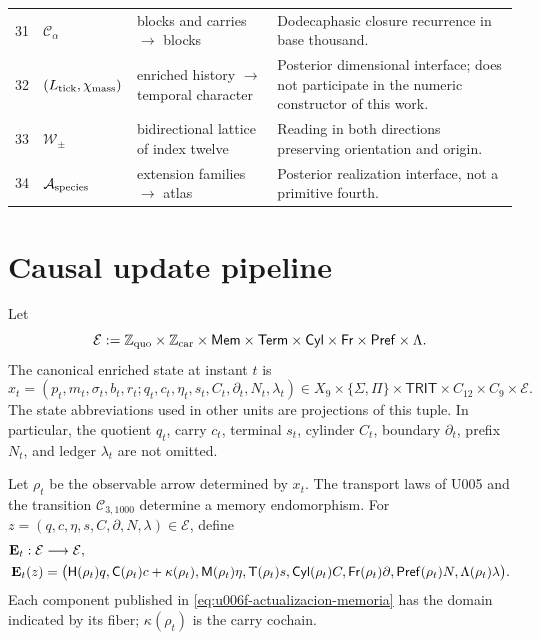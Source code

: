 \begin{longtable}{@{}r p{}p{}p{}@{}}
31&\(\mathcal C_\alpha\)&blocks and carries \(\to\) blocks&
Dodecaphasic closure recurrence in base thousand.\\
32&\((L_{\rm tick},\chi_{\rm mass})\)&enriched history \(\to\)
temporal character&
Posterior dimensional interface; does not participate in the numeric constructor of
this work.\\
33&\(\mathcal W_\pm\)&bidirectional lattice of index twelve&
Reading in both directions preserving orientation and origin.\\
34&\(\mathcal A_{\rm species}\)&extension families \(\to\) atlas&
Posterior realization interface, not a primitive fourth.\\
\bottomrule
\end{longtable}
\endgroup

\section{Causal update pipeline}

\begin{definition}
\label{def:u006f-esquema-estado}
Let
\[
 \mathcal E:=
 \mathbb Z_{\rm quo}\times\mathbb Z_{\rm car}\times
 \mathsf{Mem}\times\mathsf{Term}\times\mathsf{Cyl}\times
 \mathsf{Fr}\times\mathsf{Pref}\times\Lambda .
\]
The canonical enriched state at instant \(t\) is
\begin{equation}
 x_t=(p_t,m_t,\sigma_t,b_t,r_t;
 q_t,c_t,\eta_t,s_t,C_t,\partial_t,N_t,\lambda_t)
 \in
 X_9\times\{\Sigma,\Pi\}\times\mathsf{TRIT}\times
 C_{12}\times C_9\times\mathcal E.
 \label{eq:u006f-esquema-estado}
\end{equation}
The state abbreviations used in other units are projections of
this tuple. In particular, the quotient \(q_t\), carry
\(c_t\), terminal \(s_t\), cylinder \(C_t\), boundary
\(\partial_t\), prefix \(N_t\), and ledger \(\lambda_t\) are not omitted.
\end{definition}

Let \(\rho_t\) be the observable arrow determined by \(x_t\). The transport laws of U005 and the transition \(\mathcal C_{3,1000}\) determine a memory endomorphism. For \(z=(q,c,\eta,s,C,\partial,N,\lambda)\in\mathcal E\), define
\begin{align}
 \mathbf E_t:\mathcal E&\longrightarrow\mathcal E,\notag\\
 \mathbf E_t(z)&=\bigl(
 \mathsf H(\rho_t)q,
 \mathsf C(\rho_t)c+\kappa(\rho_t),
 \mathsf M(\rho_t)\eta,
 \mathsf T(\rho_t)s,
 \mathsf{Cyl}(\rho_t)C,
 \mathsf{Fr}(\rho_t)\partial,
 \mathsf{Pref}(\rho_t)N,
 \Lambda(\rho_t)\lambda
 \bigr).
 \label{eq:u006f-actualizacion-memoria}
\end{align}
Each component published in \eqref{eq:u006f-actualizacion-memoria} has the
domain indicated by its fiber; \(\kappa(\rho_t)\) is the carry cochain.

